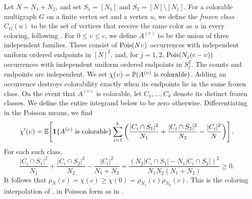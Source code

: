 Let $N = N_1 + N_2$, and set $S_1 = [N_1]$ and $S_2 = [N] \setminus [N_1]$. For a colorable multigraph $G$ on a finite vertex set and a vertex $u$, we define the \emph{frozen class} $C_G(u)$ to be the set of vertices that receive the same color as $u$ in every coloring, following \cite{culberson2001frozen}. For $0 \le \upsilon \le c$, we define $A^{(\upsilon)}$ to be the union of three independent families. These consist of $\operatorname{Pois}(N\upsilon)$ occurrences with independent uniform ordered endpoints in $[N]^2$, and, for $j = 1, 2$, $\operatorname{Pois}(N_j(c - \upsilon))$ occurrences with independent uniform ordered endpoints in $S_j^2$. The counts and endpoints are independent. We set $\chi(\upsilon) = \mathbb P(A^{(\upsilon)}\text{ is colorable})$. Adding an occurrence destroys colorability exactly when its endpoints lie in the same frozen class. On the event that $A^{(\upsilon)}$ is colorable, let $C_1, \dots, C_k$ denote its distinct frozen classes. We define the entire integrand below to be zero otherwise. Differentiating in the Poisson means, we find
\[
\chi'(\upsilon) = \mathbb E\!\left[\mathbf 1\{A^{(\upsilon)}\text{ is colorable}\}\sum_{i = 1}^k\left(\frac{|C_i \cap S_1|^2}{N_1} + \frac{|C_i \cap S_2|^2}{N_2} - \frac{|C_i|^2}{N}\right)\right].
\]
For each such class,
\begin{equation}\label{eq:ov-square}
\frac{|C_i \cap S_1|^2}{N_1} + \frac{|C_i \cap S_2|^2}{N_2} - \frac{|C_i|^2}{N_1 + N_2} = \frac{(N_2 |C_i \cap S_1| - N_1 |C_i \cap S_2|)^2}{N_1 N_2 (N_1 + N_2)} \ge 0.
\end{equation}
It follows that $\rho_N(c) = \chi(c) \ge \chi(0) = \rho_{N_1}(c)\rho_{N_2}(c)$. This is the coloring interpolation of \cite[Theorem~5 and Proposition~2]{bayati2013combinatorial}, in Poisson form as in \cite[Lemma~5.2]{openai2026limiting}.

